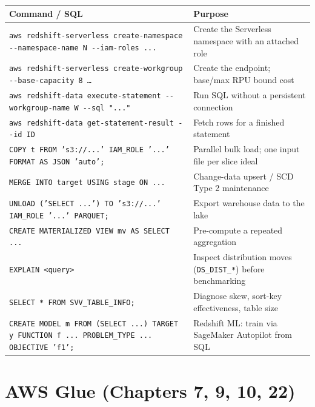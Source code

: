 \begin{center}
\footnotesize
\begin{tabular}{@{}p{7.2cm}p{7.6cm}@{}}
\toprule
\textbf{Command / SQL} & \textbf{Purpose} \\
\midrule
\texttt{aws redshift-serverless create-namespace -{}-namespace-name N -{}-iam-roles ...} & Create the Serverless namespace with an attached role \\
\texttt{aws redshift-serverless create-workgroup -{}-base-capacity 8 \dots} & Create the endpoint; base/max RPU bound cost \\
\texttt{aws redshift-data execute-statement -{}-workgroup-name W -{}-sql "..."} & Run SQL without a persistent connection \\
\texttt{aws redshift-data get-statement-result -{}-id ID} & Fetch rows for a finished statement \\
\texttt{COPY t FROM 's3://...' IAM\_ROLE '...' FORMAT AS JSON 'auto';} & Parallel bulk load; one input file per slice ideal \\
\texttt{MERGE INTO target USING stage ON ...} & Change-data upsert / SCD Type 2 maintenance \\
\texttt{UNLOAD ('SELECT ...') TO 's3://...' IAM\_ROLE '...' PARQUET;} & Export warehouse data to the lake \\
\texttt{CREATE MATERIALIZED VIEW mv AS SELECT ...} & Pre-compute a repeated aggregation \\
\texttt{EXPLAIN <query>} & Inspect distribution moves (\texttt{DS\_DIST\_*}) before benchmarking \\
\texttt{SELECT * FROM SVV\_TABLE\_INFO;} & Diagnose skew, sort-key effectiveness, table size \\
\texttt{CREATE MODEL m FROM (SELECT ...) TARGET y FUNCTION f ... PROBLEM\_TYPE ... OBJECTIVE 'f1';} & Redshift ML: train via SageMaker Autopilot from SQL \\
\bottomrule
\end{tabular}
\end{center}

\section{AWS Glue (Chapters 7, 9, 10, 22)}
%

